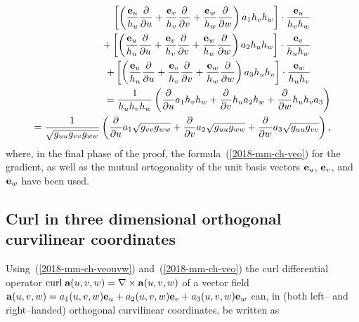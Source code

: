 \begin{equation}
\begin{split}
  \left[\left(
\frac{{\bf e}_u}{h_u}  \frac{\partial   }{\partial u}    +
\frac{{\bf e}_v}{h_v}  \frac{\partial   }{\partial v}      +
\frac{{\bf e}_w}{h_w} \frac{\partial   }{\partial w}
\right) a_1 h_v h_w\right] \cdot    \frac{ {\bf e}_u}{h_v h_w}
\qquad
 \\
+ \left[\left(
\frac{{\bf e}_u}{h_u}  \frac{\partial   }{\partial u}    +
\frac{{\bf e}_v}{h_v}  \frac{\partial   }{\partial v}      +
\frac{{\bf e}_w}{h_w} \frac{\partial   }{\partial w}
\right) a_2 h_u h_w\right] \cdot    \frac{ {\bf e}_v}{h_u h_w} \qquad \\
+ \left[\left(
\frac{{\bf e}_u}{h_u}  \frac{\partial   }{\partial u}    +
\frac{{\bf e}_v}{h_v}  \frac{\partial   }{\partial v}      +
\frac{{\bf e}_w}{h_w} \frac{\partial   }{\partial w}
\right) a_3 h_u h_v\right] \cdot    \frac{ {\bf e}_w}{h_u h_v} \qquad \\
= \frac{ 1 }{h_u h_v h_w}
\left(
\frac{\partial   }{\partial u} a_1 h_v h_w+
\frac{\partial   }{\partial v} h_u a_2 h_w+
\frac{\partial   }{\partial w} h_u h_v a_3
\right) \\
= \frac{ 1 }{\sqrt{g_{uu} g_{vv} g_{ww}}}
\left(
\frac{\partial   }{\partial u} a_1 \sqrt{g_{vv} g_{ww}}+
\frac{\partial   }{\partial v} a_2 \sqrt{g_{uu} g_{ww}}+
\frac{\partial   }{\partial w} a_3 \sqrt{g_{uu} g_{vv}}
\right),
\end{split}
\label{2018-mm-ch-divergenceoclc}
\end{equation}
where, in the final phase of the proof, the formula~(\ref{2018-mm-ch-veo}) for the gradient,
as well as the mutual ortogonality of the unit basis vectors
${\bf e}_u$,
${\bf e}_v$, and
${\bf e}_w$
have been used.


\subsection{Curl in three dimensional orthogonal curvilinear coordinates}

Using~(\ref{2018-mm-ch-veouvw}) and~(\ref{2018-mm-ch-veo})
the curl differential operator
$\text{curl} \; {\bf a}(u,v,w) = \nabla \times {\bf a}(u,v,w)$  of a vector field
${\bf a}(u,v,w) =
a_1(u,v,w) {\bf e}_u +
a_2(u,v,w) {\bf e}_v +
a_3(u,v,w) {\bf e}_w$ can,
in  (both left-- and right--handed)
orthogonal curvilinear coordinates,
be written as

